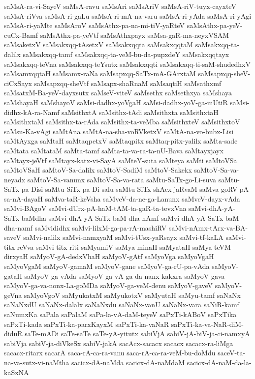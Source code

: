 {saMsA-ra-vi-SayeV
saMsA-ravu
saMsAri
saMsAriV
saMsA-riV-tuyx-cayxteV
saMsA-riVva
saMsA-ri-gaLu
saMsA-ri-mA-na-varu
saMsA-ri-yAda
saMsA-ri-yAgi
saMsA-ri-yaMte
saMsAroV
saMsAthx-pa-na-mi-tiV-yaRteV
saMsAthx-pa-yeV-cuCx-Bamf
saMsAthx-pa-yeVtf
saMsAthxpayx
saMsa-gaR-ma-neyxVSAM
saMsaketxV
saMsakxqq-tAsetxV
saMsakxqqta
saMsakxqqtaM
saMsakxqq-ta-dalilx
saMsakxqq-tamf
saMsakxqq-ta-veM-bu-da-pupxdeY
saMsakxqqtayx
saMsakxqq-teVna
saMsakxqq-teYsutx
saMsakxqqti
saMsakxqq-ti-saM-shudedhxV
saMsamxqqtaH
saMsamx-raNa
saMsapxqq-SaTx-mA-GArxtaM
saMsapxqq-sheV-ciCxSayx
saMsapxqq-sheVtf
saMsapx-shaRnaM
saMsaqtiH
saMsathxmf
saMsatxM-Ba-yeV-dayxsutx
saMseV-viteV
saMsethx
saMsethxya
saMshaya
saMshayaH
saMshayoV
saMsi-dadhx-yoVgaH
saMsi-dadhx-yoV-ga-mUtiR
saMsi-didhx-kA-ra-Namf
saMsithxtA
saMsithx-tAdi
saMsithxta
saMsithxtaH
saMsithxtaM
saMsithx-ta-rAda
saMsithx-ta-veMba
saMsithxteV
saMsithxtoV
saMsu-Ka-vAgi
saMtAna
saMtA-na-sha-voRVketxV
saMtA-na-vo-bubx-Lisi
saMtAyxga
saMtaH
saMtaqpetxV
saMtaqpitx
saMtaq-pitx-yalilx
saMta-sade
saMtata
saMtataM
saMta-tamf
saMta-ta-va-ra-ta-nU-Bava
saMtayxjayx
saMtayx-jeVtf
saMtayx-katx-vi-SayA
saMteY-suta
saMteya
saMti
saMtoVSa
saMtoVSaH
saMtoV-Sa-dalilx
saMtoV-SadiM
saMtoV-Sakekx
saMtoV-Sa-va-neyadx
saMtoV-Sa-vanunx
saMtoV-Sa-va-rata
saMtu-SaTx-go-Li-suva
saMtu-SaTx-pa-Disi
saMtu-SiTx-pa-Di-salu
saMtu-SiTx-shAcx-jaRvaM
saMva-goRV-pA-sa-nA-dayaH
saMva-taR-keVsha
saMveV-da-ne-ga-Lanunx
saMveV-dayx-vAda
saMvi-BAgoV
saMvi-dUrx-pA-haM-tAM-ta-gaR-ta-tevxVna
saMvi-dhA-yA-SaTx-baMdha
saMvi-dhA-yA-SaTx-baM-dha-nAmf
saMvi-dhA-yA-SaTx-baM-dha-namf
saMvididhx
saMvi-lilxM-ga-pa-rA-mashiRV
saMvi-nAmx-tArx-va-BA-saveV
saMvi-nalilx
saMvi-namxyaM
saMvi-tUsx-yaRsayx
saMvi-tf-kaLA
saMvi-titx-reVva
saMvi-titx-riti
saMyamiV
saMya-minaH
saMyataH
saMya-teVM-dirxyaH
saMyoV-gA-dedxVhaH
saMyoV-gAtf
saMyoVga
saMyoVgaH
saMyoVgaM
saMyoV-gamaM
saMyoV-gane
saMyoV-ga-rU-pa-vAda
saMyoV-gataH
saMyoV-ga-vAda
saMyoV-ga-vA-ga-da-nanx-kakxra
saMyoV-gava
saMyoV-ga-va-nonx-La-goMDa
saMyoV-ga-veM-denu
saMyoV-gaveV
saMyoV-geVna
saMyoVgoV
saMyukatxM
saMyukotxV
saMyutaH
saMyu-tamf
saNaNx
saNaNxdU
saNaNx-dalalx
saNaNxdu
saNaNx-vanU
saNaNx-vara
saNiR-kamf
saNumxKa
saPala
saPalaM
saPa-la-vA-daM-teyeV
saPxTi-kABoV
saPxTika
saPxTi-kada
saPxTi-ka-parxKayxM
saPxTi-ka-vaNaR
saPxTi-ka-va-NaR-diM-diduR
saTe-mADi
saTe-saTe
saTe-yA-yitutx
sabiVjA
sabiV-jA-biV-ja-ci-namxyA
sabiVja
sabiV-ja-diVkeSx
sabiV-jakA
sacAcx-sacacx
sacacx
sacacx-ra-liMga
sacacx-ritarx
sacarA
saca-rA-ca-ra-vanu
saca-rA-ca-ra-veM-bu-doMdu
saceV-ta-na-va-sutx-vi-naMtha
sacicx-dA-naMda
sacicx-dA-naMdaM
sacicx-dA-naM-da-la-kaSxNA
}
